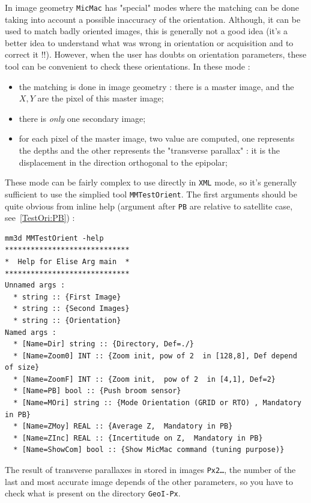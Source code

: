 In image geometry {\tt MicMac} has "special" modes where the matching can be done
taking into account a possible inaccuracy of the orientation. Although, it can be used
to match badly oriented images, this is generally not a good idea (it's a better idea to
understand what was wrong in orientation or acquisition and to correct it !!). However,
when the user has doubts on orientation parameters, these tool can  be convenient to check
these orientations. In these mode :

\begin{itemize}
   \item the matching is done in image geometry : there is a master image, and the $X,Y$
         are the pixel of this master image;
   \item there is \emph{only} one secondary image;
   \item for each pixel of the master image, two value are computed, one represents the depths
         and the other represents the "transverse parallax" : it is the displacement in the direction
         orthogonal to the epipolar;
\end{itemize}

These mode can be fairly complex to use directly in {\tt XML} mode, so it's generally sufficient
to use the simplied tool {\tt MMTestOrient}. The  first arguments should be quite obvious from
inline help (argument after {\tt PB} are relative to satellite case, see~\ref{TestOri:PB}) :

\begin{verbatim}
mm3d MMTestOrient -help
*****************************
*  Help for Elise Arg main  *
*****************************
Unnamed args :
  * string :: {First Image}
  * string :: {Second Images}
  * string :: {Orientation}
Named args :
  * [Name=Dir] string :: {Directory, Def=./}
  * [Name=Zoom0] INT :: {Zoom init, pow of 2  in [128,8], Def depend of size}
  * [Name=ZoomF] INT :: {Zoom init,  pow of 2  in [4,1], Def=2}
  * [Name=PB] bool :: {Push broom sensor}
  * [Name=MOri] string :: {Mode Orientation (GRID or RTO) , Mandatory in PB}
  * [Name=ZMoy] REAL :: {Average Z,  Mandatory in PB}
  * [Name=ZInc] REAL :: {Incertitude on Z,  Mandatory in PB}
  * [Name=ShowCom] bool :: {Show MicMac command (tuning purpose)}
\end{verbatim}

The result of transverse parallaxes in stored in images {\tt Px2\dots}, the number of the last
and most accurate image depends of the other parameters, so you have to check what is
present on the directory {\tt GeoI-Px}.

